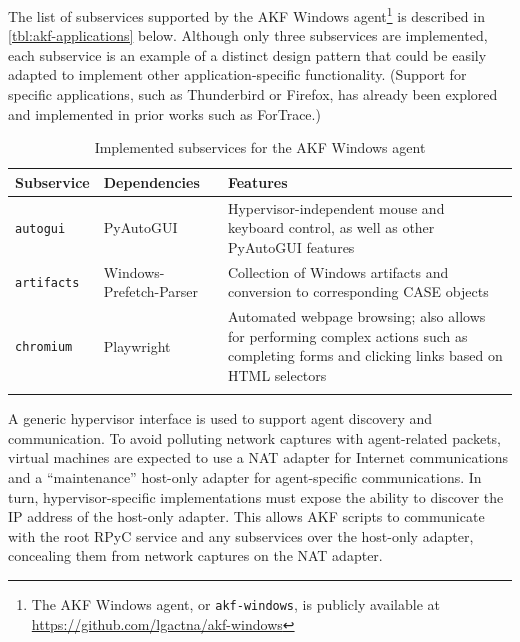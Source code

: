 \documentclass[final,5p,times,twocolumn]{elsarticle}
\newcommand{\passthrough}[1]{#1}
\begin{document}
The list of subservices supported by the AKF Windows agent\footnote{The
  AKF Windows agent, or \passthrough{\lstinline!akf-windows!}, is
  publicly available at \url{https://github.com/lgactna/akf-windows}} is
described in \autoref{tbl:akf-applications} below. Although only three
subservices are implemented, each subservice is an example of a distinct
design pattern that could be easily adapted to implement other
application-specific functionality. (Support for specific applications,
such as Thunderbird or Firefox, has already been explored and
implemented in prior works such as ForTrace.)


\begin{table}[tb]
\footnotesize
\centering
\begin{tabularx}{\linewidth}{L{0.2} L{0.2} L{0.6}}
\toprule
  \textbf{Subservice} & \textbf{Dependencies} & \textbf{Features} \\
\midrule
  \passthrough{\lstinline!autogui!} & PyAutoGUI
  \cite{sweigartAsweigartPyautogui2025a} & Hypervisor-independent
  mouse and keyboard control, as well as other PyAutoGUI features \\
  \passthrough{\lstinline!artifacts!} & Windows-Prefetch-Parser
  \cite{wittPoorBillionaireWindowsPrefetchParser2025} & Collection of
  Windows artifacts and conversion to corresponding CASE objects \\
  \passthrough{\lstinline!chromium!} & Playwright
  \cite{MicrosoftPlaywrightpython2025} & Automated webpage browsing;
  also allows for performing complex actions such as completing forms and
  clicking links based on HTML selectors \\ \\
\bottomrule
\end{tabularx}
\caption{Implemented subservices for the AKF Windows agent}\label{tbl:akf-applications}
\end{table}


A generic hypervisor interface is used to support agent discovery and
communication. To avoid polluting network captures with agent-related
packets, virtual machines are expected to use a NAT adapter for Internet
communications and a ``maintenance'' host-only adapter for
agent-specific communications. In turn, hypervisor-specific
implementations must expose the ability to discover the IP address of
the host-only adapter. This allows AKF scripts to communicate with the
root RPyC service and any subservices over the host-only adapter,
concealing them from network captures on the NAT adapter.
\end{document}
